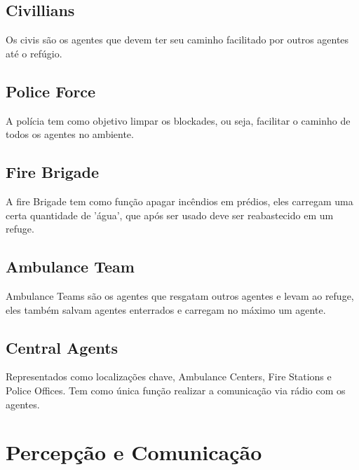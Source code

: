 \documentclass[conference]{IEEEtran}
\begin{document}
\subsection{Civillians}
Os civis são os agentes que devem ter seu caminho facilitado por outros agentes até o refúgio.
\subsection{Police Force}
A polícia tem como objetivo limpar os blockades, ou seja, facilitar o caminho de todos os agentes no ambiente.
\subsection{Fire Brigade}
A fire Brigade tem como função apagar incêndios em prédios, eles carregam uma certa quantidade de 'água', que após ser usado deve ser reabastecido em um refuge.
\subsection{Ambulance Team}
Ambulance Teams são os agentes que resgatam outros agentes e levam ao refuge, eles também salvam agentes enterrados e carregam no máximo um agente.
\subsection{Central Agents}
Representados como localizações chave, Ambulance Centers, Fire Stations e Police Offices. Tem como única função realizar a comunicação via rádio com os agentes.

\section{Percepção e Comunicação}
\end{document}
